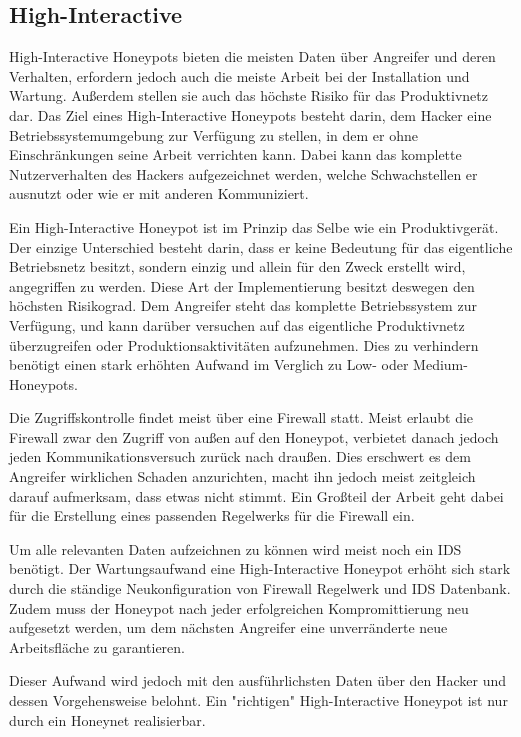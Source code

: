 \subsection{High-Interactive}
High-Interactive Honeypots bieten die meisten Daten über Angreifer und deren Verhalten, erfordern jedoch auch die meiste Arbeit bei der Installation und Wartung. Außerdem stellen sie auch das höchste Risiko für das Produktivnetz dar. Das Ziel eines High-Interactive Honeypots besteht darin, dem Hacker eine Betriebssystemumgebung zur Verfügung zu stellen, in dem er ohne Einschränkungen seine Arbeit verrichten kann. Dabei kann das komplette Nutzerverhalten des Hackers aufgezeichnet werden, welche Schwachstellen er ausnutzt oder wie er mit anderen Kommuniziert\cite{spitzner.2002a}. 

Ein High-Interactive Honeypot ist im Prinzip das Selbe wie ein Produktivgerät. Der einzige Unterschied besteht darin, dass er keine Bedeutung für das eigentliche Betriebsnetz besitzt, sondern einzig und allein für den Zweck erstellt wird, angegriffen zu werden. Diese Art der Implementierung besitzt deswegen den höchsten Risikograd. Dem Angreifer steht das komplette Betriebssystem zur Verfügung, und kann darüber versuchen auf das eigentliche Produktivnetz überzugreifen oder Produktionsaktivitäten aufzunehmen. Dies zu verhindern benötigt einen stark erhöhten Aufwand im Verglich zu Low- oder Medium-Honeypots\cite{spitzner.2002a}. 

Die Zugriffskontrolle findet meist über eine Firewall statt. Meist erlaubt die Firewall zwar den Zugriff von außen auf den Honeypot, verbietet danach jedoch jeden Kommunikationsversuch zurück nach draußen. Dies erschwert es dem Angreifer wirklichen Schaden anzurichten, macht ihn jedoch meist zeitgleich darauf aufmerksam, dass etwas nicht stimmt. Ein Großteil der Arbeit geht dabei für die Erstellung eines passenden Regelwerks für die Firewall ein\cite{spitzner.2002a}.

Um alle relevanten Daten aufzeichnen zu können wird meist noch ein IDS benötigt. Der Wartungsaufwand eine High-Interactive Honeypot erhöht sich stark durch die ständige Neukonfiguration von Firewall Regelwerk und IDS Datenbank. Zudem muss der Honeypot nach jeder erfolgreichen Kompromittierung neu aufgesetzt werden, um dem nächsten Angreifer eine unverränderte neue Arbeitsfläche zu garantieren\cite{spitzner.2002a}\cite{grimes.2003a}.

Dieser Aufwand wird jedoch mit den ausführlichsten Daten über den Hacker und dessen Vorgehensweise belohnt. Ein "richtigen" High-Interactive Honeypot ist nur durch ein Honeynet realisierbar\cite{spitzner.2002a}.